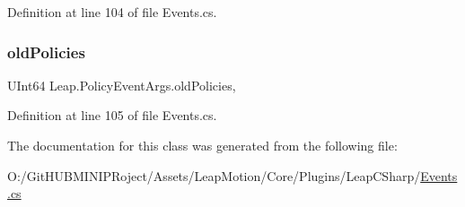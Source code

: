 Definition at line 104 of file Events.\+cs.

\mbox{\label{class_leap_1_1_policy_event_args_a3a0e12d8a1869a57be143d7a8fbd74bd}} 
\subsubsection{\texorpdfstring{oldPolicies}{oldPolicies}}
{\footnotesize\ttfamily U\+Int64 Leap.\+Policy\+Event\+Args.\+old\+Policies\hspace{0.3cm}{\ttfamily [get]}, {\ttfamily [set]}}



Definition at line 105 of file Events.\+cs.



The documentation for this class was generated from the following file\+:\begin{DoxyCompactItemize}
\item 
O\+:/\+Git\+H\+U\+B\+M\+I\+N\+I\+P\+Roject/\+Assets/\+Leap\+Motion/\+Core/\+Plugins/\+Leap\+C\+Sharp/\mbox{\hyperlink{_events_8cs}{Events.\+cs}}\end{DoxyCompactItemize}
